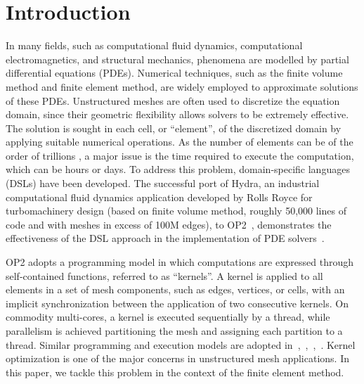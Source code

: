 \documentclass[conference]{IEEEtran}
\begin{document}
\section{Introduction}
In many fields, such as computational fluid dynamics, computational electromagnetics, and structural mechanics, phenomena are modelled by partial differential equations (PDEs). Numerical techniques, such as the finite volume method and finite element method, are widely employed to approximate solutions of these PDEs. Unstructured meshes are often used to discretize the equation domain, since their geometric flexibility allows solvers to be extremely effective. The solution is sought in each cell, or ``element'', of the discretized domain by applying suitable numerical operations. As the number of elements can be of the order of trillions \cite{Rossinelli2013}, a major issue is the time required to execute the computation, which can be hours or days. To address this problem, domain-specific languages (DSLs) have been developed. The successful port of Hydra, an industrial computational fluid dynamics application developed by Rolls Royce for turbomachinery design (based on finite volume method, roughly 50,000 lines of code and with meshes in excess of 100M edges), to OP2~\cite{op2-main}, demonstrates the effectiveness of the DSL approach in the implementation of PDE solvers~\cite{IstvanHydra}.

OP2 adopts a programming model in which computations are expressed through self-contained functions, referred to as ``kernels''. A kernel is applied to all elements in a set of mesh components, such as edges, vertices, or cells, with an implicit synchronization between the application of two consecutive kernels. On commodity multi-cores, a kernel is executed sequentially by a thread, while parallelism is achieved partitioning the mesh and assigning each partition to a thread. Similar programming and execution models are adopted in~\cite{pyop2isc},~\cite{Fenics},~\cite{fluidity_manual_v4},~\cite{lizst}. Kernel optimization is one of the major concerns in unstructured mesh applications. In this paper, we tackle this problem in the context of the finite element method.
\end{document}
